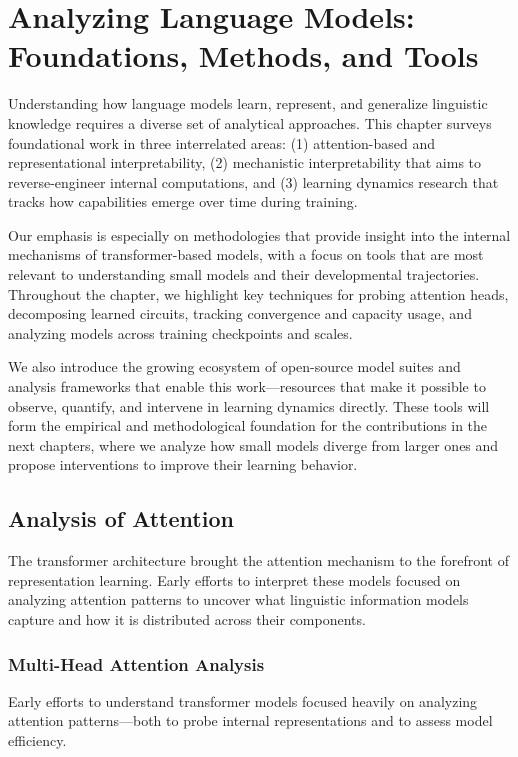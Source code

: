 \chapter{Analyzing Language Models: Foundations, Methods, and Tools}
\label{sec:analysis-background}

Understanding how language models learn, represent, and generalize linguistic knowledge requires a diverse set of analytical approaches. This chapter surveys foundational work in three interrelated areas: (1) attention-based and representational interpretability, (2) mechanistic interpretability that aims to reverse-engineer internal computations, and (3) learning dynamics research that tracks how capabilities emerge over time during training. 

Our emphasis is especially on methodologies that provide insight into the internal mechanisms of transformer-based models, with a focus on tools that are most relevant to understanding small models and their developmental trajectories. Throughout the chapter, we highlight key techniques for probing attention heads, decomposing learned circuits, tracking convergence and capacity usage, and analyzing models across training checkpoints and scales.

We also introduce the growing ecosystem of open-source model suites and analysis frameworks that enable this work—resources that make it possible to observe, quantify, and intervene in learning dynamics directly. These tools will form the empirical and methodological foundation for the contributions in the next chapters, where we analyze how small models diverge from larger ones and propose interventions to improve their learning behavior.
\section{Analysis of Attention}

The transformer architecture brought the attention mechanism to the forefront of representation learning. Early efforts to interpret these models focused on analyzing attention patterns to uncover what linguistic information models capture and how it is distributed across their components.

\subsection{Multi-Head Attention Analysis}

Early efforts to understand transformer models focused heavily on analyzing attention patterns—both to probe internal representations and to assess model efficiency.

